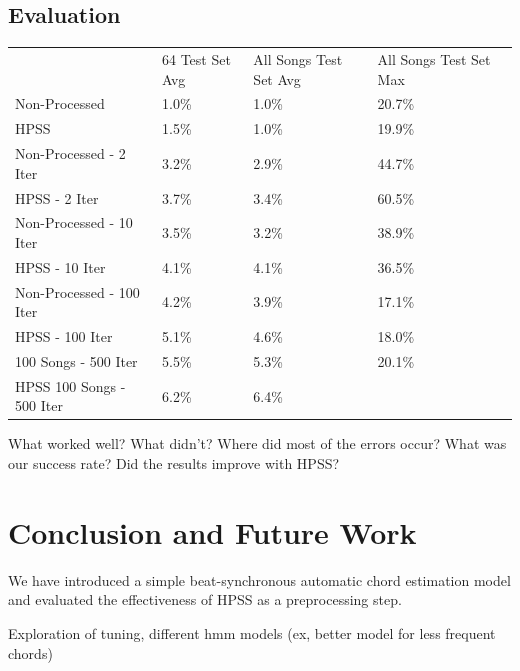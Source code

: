 \documentclass{article}
\begin{document}
\subsection{Evaluation}

\begin{table}[h]
\begin{tabular}{lllll}
                          & 64 Test Set Avg & All Songs Test Set Avg & All Songs Test Set Max &  \\
Non-Processed             & 1.0\%           & 1.0\%                  & 20.7\%                 &  \\
HPSS                      & 1.5\%           & 1.0\%                  & 19.9\%                 &  \\
Non-Processed - 2 Iter    & 3.2\%           & 2.9\%                  & 44.7\%                 &  \\
HPSS - 2 Iter             & 3.7\%           & 3.4\%                  & 60.5\%                 &  \\
Non-Processed - 10 Iter   & 3.5\%           & 3.2\%                  & 38.9\%                 &  \\
HPSS - 10 Iter            & 4.1\%           & 4.1\%                  & 36.5\%                 &  \\
Non-Processed - 100 Iter  & 4.2\%           & 3.9\%                  & 17.1\%                 &  \\
HPSS - 100 Iter           & 5.1\%           & 4.6\%                  & 18.0\%                 &  \\
100 Songs - 500 Iter      & 5.5\%           & 5.3\%                  & 20.1\%                 &  \\
HPSS 100 Songs - 500 Iter & 6.2\%           & 6.4\%                  &                        & 
\end{tabular}
\end{table}

What worked well? What didn't? Where did most of the errors occur?
What was our success rate? Did the results improve with HPSS?

\section{Conclusion and Future Work}

We have introduced a simple beat-synchronous automatic chord estimation model
and evaluated the effectiveness of HPSS as a preprocessing step.

Exploration of tuning, different hmm models (ex, better model for less frequent chords)
\end{document}
